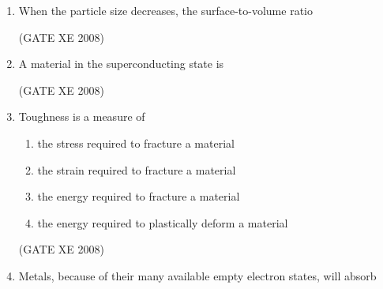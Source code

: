 \documentclass[12pt]{article}
\begin{document}
\begin{enumerate}
\begin{enumerate}
\end{enumerate}

    (GATE XE 2008)  
\item When the particle size decreases, the surface-to-volume ratio  

\begin{enumerate}
\end{enumerate}

    (GATE XE 2008)  
\item A material in the superconducting state is  

\begin{enumerate}
\end{enumerate}

    (GATE XE 2008)  
\item Toughness is a measure of  

\begin{enumerate}
\item  the stress required to fracture a material  
\item  the strain required to fracture a material 
\item  the energy required to fracture a material 
\item  the energy required to plastically deform a material 
\end{enumerate}

    (GATE XE 2008)  
\item Metals, because of their many available empty electron states, will absorb  


\end{enumerate}
\end{document}
